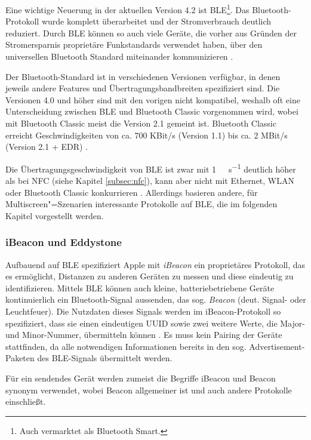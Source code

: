 Eine wichtige Neuerung in der aktuellen Version 4.2 ist \ac{BLE}\footnote{Auch vermarktet als Bluetooth Smart.}. Das Bluetooth-Protokoll wurde komplett überarbeitet und der Stromverbrauch deutlich reduziert. Durch \ac{BLE} können so auch viele Geräte, die vorher aus Gründen der Stromersparnis proprietäre Funkstandards verwendet haben, über den universellen Bluetooth Standard miteinander kommunizieren \citep{Hansen2015}.

Der Bluetooth-Standard ist in verschiedenen Versionen verfügbar, in denen jeweils andere Features und Übertragungsbandbreiten spezifiziert sind. Die Versionen 4.0 und höher sind mit den vorigen nicht kompatibel, weshalb oft eine Unterscheidung zwischen \ac{BLE} und Bluetooth Classic vorgenommen wird, wobei mit Bluetooth Classic meist die Version 2.1 gemeint ist. Bluetooth Classic erreicht Geschwindigkeiten von ca. 700 KBit/s (Version 1.1) bis ca. 2 MBit/s (Version 2.1 + EDR) \citep[129]{Fuchs2009}.  

Die Übertragungsgeschwindigkeit von \acs{BLE} ist zwar mit \SI{1}{\mega\Bit\per\second} deutlich höher als \zb bei \acs{NFC} (siehe Kapitel \ref{subsec:nfc}), kann aber nicht mit Ethernet, WLAN oder Bluetooth Classic konkurrieren \citep{Wikipedia2015}. Allerdings basieren andere, für Multiscreen"=Szenarien interessante Protokolle auf \ac{BLE}, die im folgenden Kapitel vorgestellt werden.

\subsubsection{iBeacon und Eddystone}
\label{subsec:ibeacon}
Aufbauend auf \ac{BLE} spezifiziert Apple mit \textit{iBeacon} ein proprietäres Protokoll, das es ermöglicht, Distanzen zu anderen Geräten zu messen und diese eindeutig zu identifizieren. Mittels \ac{BLE} können auch kleine, batteriebetriebene Geräte kontinuierlich ein Bluetooth-Signal aussenden, das sog. \textit{Beacon} (deut. Signal- oder Leuchtfeuer). Die Nutzdaten dieses Signals werden im iBeacon-Protokoll so spezifiziert, dass sie einen eindeutigen \ac{UUID} sowie zwei weitere Werte, die Major- und Minor-Nummer, übermitteln können \citep{iBeacon}. Es muss kein Pairing der Geräte stattfinden, da alle notwendigen Informationen bereits in den sog. Advertisement-Paketen des BLE-Signals übermittelt werden.

Für ein sendendes Gerät werden zumeist die Begriffe iBeacon und Beacon synonym verwendet, wobei Beacon allgemeiner ist und auch andere Protokolle einschließt. 

